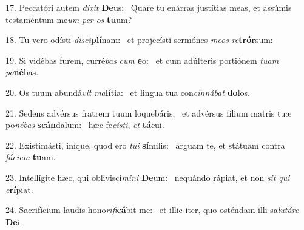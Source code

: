17. Peccatóri autem \textit{di}\textit{xit} \textbf{De}us: \ast\  Quare tu enárras justítias meas, et assúmis testaméntum me\textit{um} \textit{per} \textit{os} \textbf{tu}um?\

18. Tu vero odísti \textit{di}\textit{sci}\textbf{plí}nam: \ast\  et projecísti sermónes \textit{me}\textit{os} \textit{re}\textbf{trór}sum:\

19. Si vidébas furem, curré\textit{bas} \textit{cum} \textbf{e}o: \ast\  et cum adúlteris portiónem \textit{tu}\textit{am} \textit{po}\textbf{né}bas.\

20. Os tuum abundá\textit{vit} \textit{ma}\textbf{lí}tia: \ast\  et lingua tua con\textit{cin}\textit{ná}\textit{bat} \textbf{do}los.\

21. Sedens advérsus fratrem tuum loquebáris, \dag\  et advérsus fílium matris tuæ po\textit{né}\textit{bas} \textbf{scán}dalum: \ast\  hæc fe\textit{cís}\textit{ti}, \textit{et} \textbf{tá}cui.\

22. Existimásti, iníque, quod ero \textit{tu}\textit{i} \textbf{sí}milis: \ast\  árguam te, et státuam contra \textit{fá}\textit{ci}\textit{em} \textbf{tu}am.\

23. Intellígite hæc, qui obliviscí\textit{mi}\textit{ni} \textbf{De}um: \ast\  nequándo rápiat, et non \textit{sit} \textit{qui} \textit{e}\textbf{rí}piat.\

24. Sacrifícium laudis hono\textit{ri}\textit{fi}\textbf{cá}bit me: \ast\  et illic iter, quo osténdam illi sa\textit{lu}\textit{tá}\textit{re} \textbf{De}i.\

